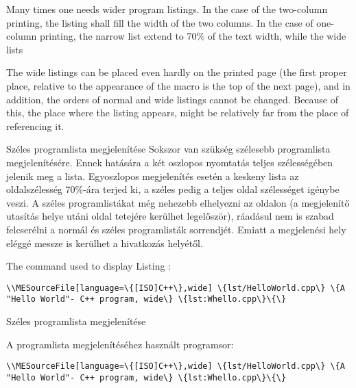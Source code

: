 {
Many times one needs wider program listings.
In the case of the two-column printing, 
the listing shall fill the width of the two columns.
In the case of one-column printing, the narrow list extend to 70\% of the text width,
while the wide lists 

The wide listings can be placed even hardly on the printed page
(the first proper place, relative to the appearance of the macro
is the top of the next page), and in addition, the orders of 
normal and wide listings cannot be changed.
Because of this, the place where the listing appears,
might be relatively far from the place of referencing it.
}
{Széles programlista megjelenítése}
{
Sokszor van szükség szélesebb programlista megjelenítésére. Ennek hatására a két
oszlopos nyomtatás teljes szélességében jelenik meg a lista.
Egyoszlopos megjelenítés esetén a keskeny lista az oldalszélesség 70\%-ára terjed ki,
a széles pedig a teljes oldal szélességet igénybe veszi.
A széles programlistákat még nehezebb elhelyezni az oldalon (a megjelenítő utasítás helye
utáni oldal tetejére kerülhet legelőször), ráadásul nem is szabad
felcserélni a normál és széles programlisták sorrendjét.
Emiatt a megjelenési hely eléggé messze is kerülhet
a hivatkozás helyétől.
}

{


The command used to display Listing \ao{\ref{lst:Whello.cpp}} :
\par\noindent\lstinline|\\MESourceFile[language=\{[ISO]C++\},wide] \{lst/HelloWorld.cpp\} \{A "Hello World"- C++ program, wide\} \{lst:Whello.cpp\}\{\}|
}
{Széles programlista megjelenítése}
{


A \ao{\ref{lst:Whello.cpp}} programlista megjelenítéséhez használt programsor:
\par\noindent\lstinline|\\MESourceFile[language=\{[ISO]C++\},wide] \{lst/HelloWorld.cpp\} \{A "Hello World"- C++ program, wide\} \{lst:Whello.cpp\}\{\}|
}


